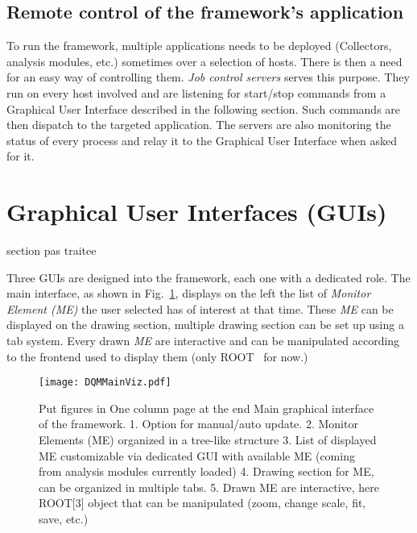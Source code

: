 \documentclass[conference]{IEEEtran}
\begin{document}
\subsection{Remote control of the framework's application}
To run the framework, multiple applications needs to be deployed (Collectors, analysis modules, etc.) sometimes over a selection of hosts. There is then a need for an easy way of controlling them. \textit{Job control servers} serves this purpose. They run on every host involved and are listening for start/stop commands from a Graphical User Interface described in the following section. Such commands are then dispatch to the targeted application. The servers are also monitoring the status of every process and relay it to the Graphical User Interface when asked for it.

\section{Graphical User Interfaces (GUIs)}
{\color{red}section pas traitee}


Three GUIs are designed into the framework, each one with a dedicated role. The main interface, as shown in Fig.~\ref{fig:DQMMainViz}, displays on the left the list of \textit{Monitor Element (ME)} the user selected has of interest at that time. These \textit{ME} can be displayed on the drawing section, multiple drawing section can be set up using a tab system. Every drawn \textit{ME} are interactive and can be manipulated according to the frontend used to display them (only ROOT~\cite{ROOT} for now.)
\begin{figure}[p]
  \begin{center}
    \texttt{[image: DQMMainViz.pdf]}
    \caption{\label{fig:DQMMainViz} {\color{red}Put figures in One column page at the end}
    Main graphical interface of the framework.
    1. Option for manual/auto update.
    2. Monitor Elements (ME) organized in a tree-like structure
    3. List of displayed ME customizable via dedicated GUI with available ME (coming from analysis modules currently loaded)
    4. Drawing section for ME, can be organized in multiple tabs.
    5. Drawn ME are interactive, here ROOT[3] object that can be manipulated (zoom, change scale, fit, save, etc.)
}
  \end{center}
\end{figure}
\end{document}
